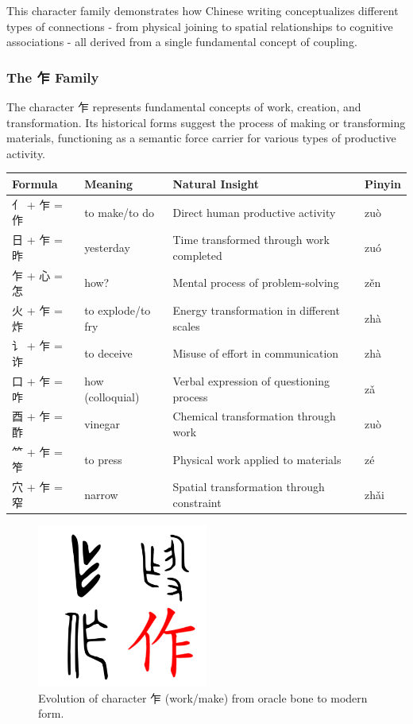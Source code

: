 \documentclass[11pt,letterpaper]{article}
\begin{document}
This character family demonstrates how Chinese writing conceptualizes
different types of connections - from physical joining to spatial
relationships to cognitive associations - all derived from a single
fundamental concept of coupling.

\subsubsection{The 乍 Family}\label{the-ux4e4d-family}

The character 乍 represents fundamental concepts of work, creation, and
transformation. Its historical forms suggest the process of making or
transforming materials, functioning as a semantic force carrier for
various types of productive activity.

\begin{longtable}{|p{3cm}|p{3cm}|p{6cm}|p{2cm}|}
\hline
\textbf{Formula} & \textbf{Meaning} & \textbf{Natural Insight} & \textbf{Pinyin} \\
\hline
亻 + 乍 = 作 & to make/to do & Direct human productive activity & zuò \\
\hline
日 + 乍 = 昨 & yesterday & Time transformed through work completed &
zuó \\
\hline
乍 + 心 = 怎 & how? & Mental process of problem-solving & zěn \\
\hline
火 + 乍 = 炸 & to explode/to fry & Energy transformation in different
scales & zhà \\
\hline
讠 + 乍 = 诈 & to deceive & Misuse of effort in communication & zhà \\
\hline
口 + 乍 = 咋 & how (colloquial) & Verbal expression of questioning
process & zǎ \\
\hline
酉 + 乍 = 酢 & vinegar & Chemical transformation through work & zuò \\
\hline
⺮ + 乍 = 笮 & to press & Physical work applied to materials & zé \\
\hline
穴 + 乍 = 窄 & narrow & Spatial transformation through constraint &
zhǎi \\
\hline
\end{longtable}

\begin{figure}
\centering
\includegraphics[width=0.5\textwidth]{./images/zi_work.png}
\caption{Evolution of character 乍 (work/make) from oracle bone to
modern form.}
\end{figure}
\end{document}
